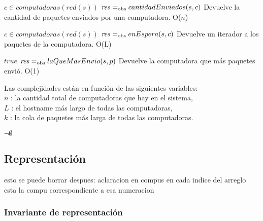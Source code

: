  {$c \in computadoras(red(s))$}
 {$\text{\textit{res}} =_{\mathrm{obs}} cantidadEnviados(s,c)$}
 {Devuelve la cantidad de paquetes enviados por una computadora.}
 {O($n$)} %

 {$c \in computadoras(red(s))$}
 {$\text{\textit{res}} =_{\mathrm{obs}} enEspera(s,c)$}
 {Devuelve un iterador a los paquetes de la computadora.}
 {O(L)}

 {$true$}
 {$\text{\textit{res}} =_{\mathrm{obs}} laQueMasEnvio(s,p)$}
 {Devuelve la computadora que más paquetes envió.}
 {O(1)}

Las complejidades están en función de las siguientes variables:\\
$n$ : la cantidad total de computadoras que hay en el sistema, \\
$L$ : el hostname más largo de todas las computadoras, \\
$k$ : la cola de paquetes más larga de todas las computadoras. 


$\neg \emptyset$

\subsection{Representación}


esto se puede borrar despues:
aclaracion en compus en cada indice del arreglo esta la compu correspondiente a esa numeracion

\subsubsection*{Invariante de representación}

